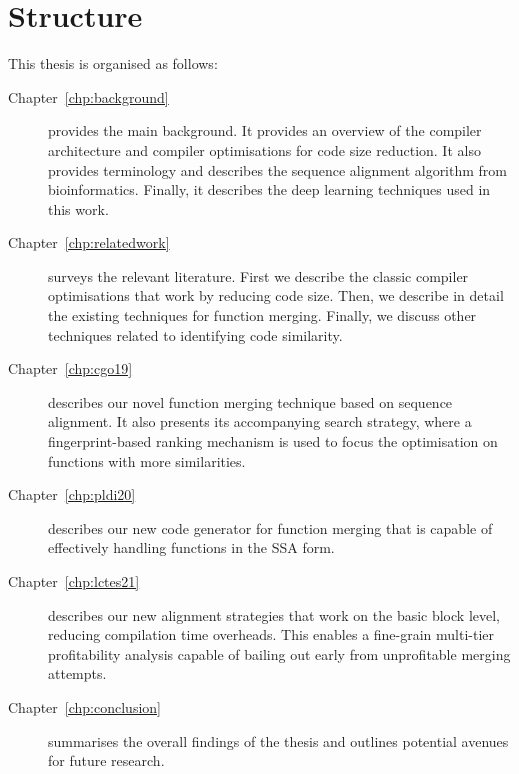 \section{Structure}

This thesis is organised as follows:
\begin{description}

\item[Chapter~\ref{chp:background}] provides the main background. It provides an overview of the compiler architecture and compiler optimisations for code size reduction.
It also provides terminology and describes the sequence alignment algorithm from bioinformatics.
Finally, it describes the deep learning techniques used in this work.

\item[Chapter~\ref{chp:relatedwork}] surveys the relevant literature. First we describe the classic compiler optimisations that work by reducing code size. Then, we describe in detail the existing techniques for function merging. Finally, we discuss other techniques related to identifying code similarity.

\item[Chapter~\ref{chp:cgo19}] describes our novel function merging technique based on sequence alignment.
It also presents its accompanying search strategy, where a fingerprint-based ranking mechanism is used to focus the optimisation on functions with more similarities.

\item[Chapter~\ref{chp:pldi20}] describes our new code generator for function merging that is capable of effectively handling functions in the SSA form.

\item[Chapter~\ref{chp:lctes21}] describes our new alignment strategies that work on the basic block level, reducing compilation time overheads.
This enables a fine-grain multi-tier profitability analysis capable of bailing out early from unprofitable merging attempts.


\item[Chapter~\ref{chp:conclusion}] summarises the overall findings of the thesis and outlines potential avenues for future research.

\end{description}
